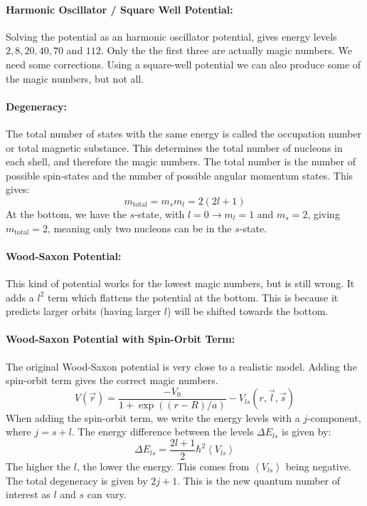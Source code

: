 \paragraph{Harmonic Oscillator / Square Well Potential:}

Solving the potential as an harmonic oscillator potential, gives energy levels $2, 8, 20, 40, 70$ and $112$. Only the the first three are actually magic numbers. We need some corrections. Using a square-well potential we can also produce some of the magic numbers, but not all. 

\paragraph{Degeneracy:}
The total number of states with the same energy is called the occupation number or total magnetic substance. This determines the total number of nucleons in each shell, and therefore the magic numbers. The total number is the number of possible spin-states and the number of possible angular momentum states. This gives: 
\begin{equation}
  m_{\text{total}} = m_s m_l = 2(2l+1)
\end{equation}
At the bottom, we have the $s$-state, with $l = 0 → m_l = 1$ and $m_s = 2$, giving $m_{\text{total}} = 2$, meaning only two nucleons can be in the $s$-state.

\paragraph{Wood-Saxon Potential:} 
This kind of potential works for the lowest magic numbers, but is still wrong. It adds a $l^2$ term which flattens the potential at the bottom. This is because it predicts larger orbits (having larger $l$) will be shifted towards the bottom. 

\paragraph{Wood-Saxon Potential with Spin-Orbit Term:}
The original Wood-Saxon potential is very close to a realistic model. Adding the spin-orbit term gives the correct magic numbers. 
\begin{equation}
  V(\vec{r}) = \frac{-V_0}{1 + \exp \left((r - R)/a\right)} - V_{ls}(r, \vec{l},\vec{s})
\end{equation}
When adding the spin-orbit term, we write the energy levels with a $j$-component, where $j = s + l$. The energy difference between the levels $ΔE_{ls}$ is given by:
\begin{equation}
    ΔE_{ls} = \frac{2l + 1}{2} ℏ^2 \left<V_{ls}\right>
\end{equation}
The higher the $l$, the lower the energy. This comes from $\left<V_{ls}\right>$ being negative. The total degeneracy is given by $2j + 1$. This is the new quantum number of interest as $l$ and $s$ can vary. 

